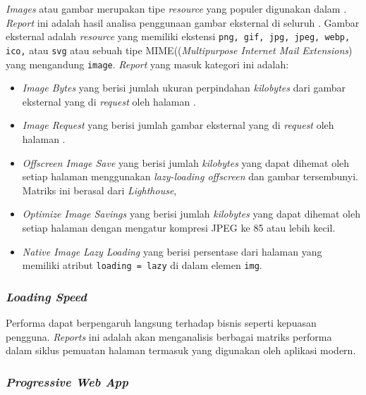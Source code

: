 \textit{Images} atau gambar merupakan tipe \textit{resource} yang populer digunakan dalam \web. \textit{Report} ini adalah hasil analisa penggunaan gambar eksternal di seluruh \web. Gambar eksternal adalah \textit{resource} yang memiliki ekstensi \verb|png, gif, jpg, jpeg, webp, ico,| atau \verb|svg| atau sebuah tipe MIME((\textit{Multipurpose Internet Mail Extensions}) yang mengandung \verb|image|. \textit{Report} yang masuk kategori ini adalah:
\begin{itemize}
    \item \textit{Image Bytes} yang berisi jumlah ukuran perpindahan \textit{kilobytes} dari gambar eksternal yang di \textit{request} oleh halaman \web.

    \item \textit{Image Request} yang berisi jumlah gambar eksternal yang di \textit{request} oleh halaman \web.

    \item \textit{Offscreen Image Save} yang berisi jumlah \textit{kilobytes} yang dapat dihemat oleh setiap halaman menggunakan \textit{lazy-loading offscreen} dan gambar tersembunyi. Matriks ini berasal dari \textit{Lighthouse},

    \item \textit{Optimize Image Savings} yang berisi jumlah \textit{kilobytes} yang dapat dihemat oleh setiap halaman dengan mengatur kompresi JPEG ke 85 atau lebih kecil.

    \item \textit{Native Image Lazy Loading} yang berisi persentase dari halaman yang memiliki atribut \verb|loading = lazy| di dalam elemen \verb|img|.
\end{itemize}

\subsubsection{\textit{Loading Speed}}
\label{subsub:loading}

Performa \web dapat berpengaruh langsung terhadap bisnis seperti kepuasan pengguna. \textit{Reports} ini adalah akan menganalisis berbagai matriks performa dalam siklus pemuatan halaman \web termasuk yang digunakan oleh aplikasi \web modern.

\subsubsection{\textit{Progressive Web App}}
\label{subsub:pwa}

